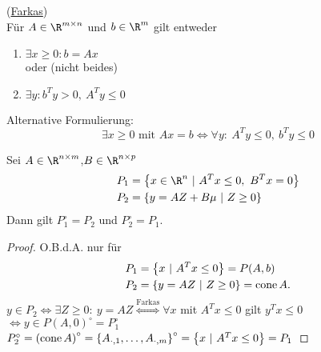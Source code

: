 \begin{lemma}
	(\underline{Farkas})\\
	Für $A \in \R^{m \times n}$ und $b \in \R^m$ gilt entweder
	\begin{enumerate}[label = (\alph*)]
		\item $\exists x \geq 0: b= Ax$\\
			oder (nicht beides)
		\item  $\exists y: b^{T} y > 0,\ A^{T} y \leq 0$
	\end{enumerate}
	Alternative Formulierung:
	\begin{equation*}
		\exists x \geq 0 \text{ mit } Ax=b \iff \forall y:\ A^{T} y \leq 0,\ b^{T} y \leq 0
	\end{equation*}
\end{lemma}
\begin{satz}
	Sei $A\in \R^{n \times m}$,$B \in \R^{n \times p}$
	 \begin{align*}
		 P_{1} &= \left\{ x \in \R^n \ |\ A^{T} x \leq 0,\ B^{T} x =0 \right\}\\
		 P_{2} &= \left\{ y = AZ + B\mu\ |\ Z \geq 0\right\}\\
	\end{align*}
	Dann gilt $P_{1}^\circ = P_{2}$ und $P_{2}^\circ = P_{1}$.
\end{satz}
\begin{proof}
	O.B.d.A. nur für 
	\begin{align*}
		P_{1} &= \left\{ x \ |\ A^{T} x \leq 0 \right\} = P(A,b)\\
		P_{2} &= \left\{ y = AZ \ |\ Z \geq 0 \right\}= \operatorname{cone} A.
	\end{align*}
	$y\in P_{2} \iff \exists Z \geq 0 : \ y = AZ \overset{\text{Farkas}}{\iff} \forall x$ mit $A^{T} x \leq 0$ gilt $y^{T} x \leq 0$ $\iff y \in P(A,0)^\circ=P_{1}^\circ$\\
	$P_{2}^\circ = \left( \cone A \right)^\circ = \left\{ A_{\cdot,1},\dots ,A_{\cdot,m} \right\}^\circ = \left\{x \ |\ A^{T} x \leq 0 \right\} = P_{1}$
\end{proof}



